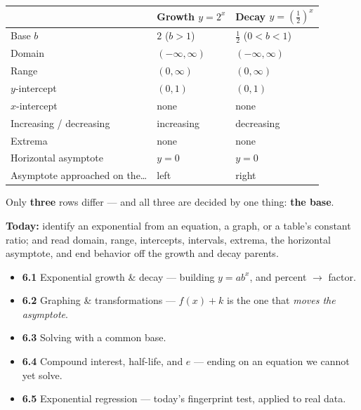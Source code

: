 \documentclass[aspectratio=169, 11pt]{beamer}
\begin{document}
\begin{frame}[t, plain]
  \begin{center}
  \renewcommand{\arraystretch}{1.3}
  \begin{tabular}{lll}
  \hline
   & \textbf{Growth} $y=2^{x}$ & \textbf{Decay} $y=\left(\frac12\right)^{x}$ \\
  \hline
  Base $b$ & $2$ \; ($b>1$) & $\frac12$ \; ($0<b<1$) \\
  Domain & $(-\infty,\infty)$ & $(-\infty,\infty)$ \\
  Range & $(0,\infty)$ & $(0,\infty)$ \\
  $y$-intercept & $(0,1)$ & $(0,1)$ \\
  $x$-intercept & none & none \\
  Increasing / decreasing & increasing & decreasing \\
  Extrema & none & none \\
  Horizontal asymptote & $y=0$ & $y=0$ \\
  Asymptote approached on the\dots & left & right \\
  \hline
  \end{tabular}
  \end{center}
  \vspace{3pt}
  \begin{center}
    Only \textbf{three} rows differ --- and all three are decided by one thing: \textbf{the base}.
  \end{center}
\end{frame}

\begin{frame}[t, plain]
  \textbf{Today:} identify an exponential from an equation, a graph, or a table's constant ratio; and
  read domain, range, intercepts, intervals, extrema, the horizontal asymptote, and end behavior off
  the growth and decay parents.\\[8pt]
  \begin{itemize}\setlength{\itemsep}{3pt}
    \item \textbf{6.1} Exponential growth \& decay --- building $y=ab^{x}$, and percent $\to$ factor.
    \item \textbf{6.2} Graphing \& transformations --- $f(x)+k$ is the one that \emph{moves the asymptote}.
    \item \textbf{6.3} Solving with a common base.
    \item \textbf{6.4} Compound interest, half-life, and $e$ --- ending on an equation we cannot yet solve.
    \item \textbf{6.5} Exponential regression --- today's fingerprint test, applied to real data.
  \end{itemize}
\end{frame}
\end{document}
